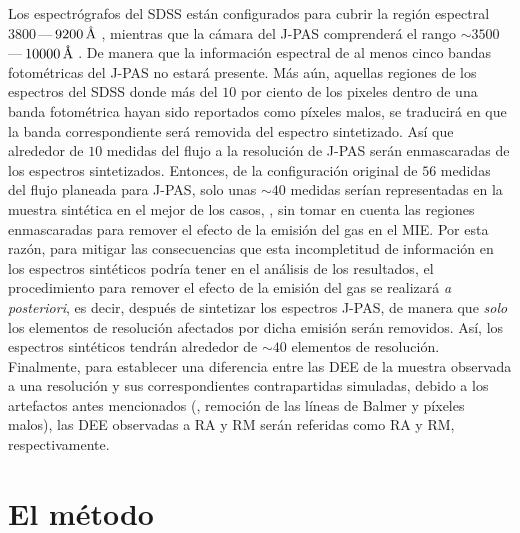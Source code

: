 Los espectrógrafos del SDSS están configurados para cubrir la región espectral
$3800\,$---$\,\unit[9200]{\AA}$ \citep{Strauss2002}, mientras que la cámara del J-PAS comprenderá el
rango $\sim3500\,$---$\,\unit[10000]{\AA}$ \citep{Marin-Franch2015}. De manera que la información
espectral de al menos cinco bandas fotométricas del J-PAS no estará presente. Más aún, aquellas
regiones de los espectros del SDSS donde más del $10$ por ciento de los pixeles dentro de una banda
fotométrica hayan sido reportados como píxeles malos, se traducirá en que la banda correspondiente
será removida del espectro sintetizado. Así que alrededor de $10$ medidas del flujo a la resolución
de J-PAS serán enmascaradas de los espectros sintetizados. Entonces, de la configuración original de
$56$ medidas del flujo planeada para J-PAS, solo unas $\sim40$ medidas serían representadas en la
muestra sintética en el mejor de los casos, \ie, sin tomar en cuenta las regiones enmascaradas para
remover el efecto de la emisión del gas en el MIE. Por esta razón, para mitigar las consecuencias
que esta incompletitud de información en los espectros sintéticos podría tener en el análisis de los
resultados, el procedimiento para remover el efecto de la emisión del gas se realizará \emph{a
posteriori}, es decir, después de sintetizar los espectros J-PAS, de manera que \emph{solo} los
elementos de resolución afectados por dicha emisión serán removidos. Así, los espectros sintéticos
tendrán alrededor de $\sim40$ elementos de resolución. Finalmente, para establecer una diferencia
entre las DEE de la muestra observada a una resolución y sus correspondientes contrapartidas
simuladas, debido a los artefactos antes mencionados (\eg, remoción de las líneas de Balmer y
píxeles malos), las DEE observadas a RA y RM serán referidas como RA\up{*} y RM\up{*},
respectivamente.


\section{El método}

